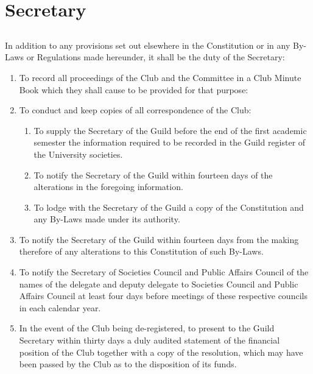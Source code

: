 \documentclass[10.5pt]{article}
\begin{document}
\section{Secretary}
\subsection{} In addition to any provisions set out elsewhere in the Constitution or in any By-Laws or Regulations made hereunder, it shall be the duty of the Secretary: 
\begin{enumerate}[label=(\alph*)]
    \item To record all proceedings of the Club and the Committee in a Club Minute Book which they shall cause to be provided for that purpose: 
    \item To conduct and keep copies of all correspondence of the Club:
    
    \begin{enumerate}[label=(\roman*)]
        \item To supply the Secretary of the Guild before the end of the first academic semester the information required to be recorded in the Guild register of the University societies. 
        \item To notify the Secretary of the Guild within fourteen days of the alterations in the foregoing information. 
        \item To lodge with the Secretary of the Guild a copy of the Constitution and any By-Laws made under its authority. 
    \end{enumerate}
    
\item To notify the Secretary of the Guild within fourteen days from the making therefore of any alterations to this Constitution of such By-Laws. 
\item To notify the Secretary of Societies Council and Public Affairs Council of the names of the delegate and deputy delegate to Societies Council and Public Affairs Council at least four days before meetings of these respective councils in each calendar year. 
\item In the event of the Club being de-registered, to present to the Guild Secretary within thirty days a duly audited statement of the financial position of the Club together with a copy of the resolution, which may have been passed by the Club as to the disposition of its funds. 
\newline
\end{enumerate}
\end{document}
